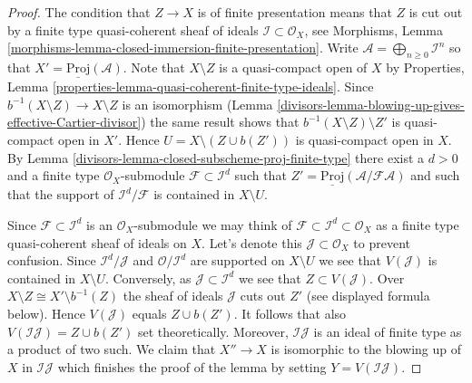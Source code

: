 \begin{proof}

The condition that $Z \to X$ is of finite presentation means that
$Z$ is cut out by a finite type quasi-coherent sheaf of ideals
$\mathcal{I} \subset \mathcal{O}_X$, see
Morphisms, Lemma \ref{morphisms-lemma-closed-immersion-finite-presentation}.
Write $\mathcal{A} = \bigoplus_{n \geq 0} \mathcal{I}^n$ so that
$X' = \underline{\text{Proj}}(\mathcal{A})$.
Note that $X \setminus Z$ is a quasi-compact open of $X$ by
Properties, Lemma \ref{properties-lemma-quasi-coherent-finite-type-ideals}.
Since $b^{-1}(X \setminus Z) \to X \setminus Z$ is an isomorphism
(Lemma \ref{divisors-lemma-blowing-up-gives-effective-Cartier-divisor}) the same
result shows that
$b^{-1}(X \setminus Z) \setminus Z'$ is quasi-compact open in $X'$.
Hence $U = X \setminus (Z \cup b(Z'))$ is quasi-compact open in $X$.
By Lemma \ref{divisors-lemma-closed-subscheme-proj-finite-type}
there exist a $d > 0$ and a finite type
$\mathcal{O}_X$-submodule $\mathcal{F} \subset \mathcal{I}^d$ such
that $Z' = \underline{\text{Proj}}(\mathcal{A}/\mathcal{F}\mathcal{A})$
and such that the support of $\mathcal{I}^d/\mathcal{F}$ is contained
in $X \setminus U$.

\medskip\noindent
Since $\mathcal{F} \subset \mathcal{I}^d$ is an $\mathcal{O}_X$-submodule
we may think of $\mathcal{F} \subset \mathcal{I}^d \subset \mathcal{O}_X$
as a finite type quasi-coherent sheaf of ideals on $X$. Let's denote this
$\mathcal{J} \subset \mathcal{O}_X$ to prevent confusion. Since
$\mathcal{I}^d / \mathcal{J}$ and $\mathcal{O}/\mathcal{I}^d$
are supported on $X \setminus U$ we see that $V(\mathcal{J})$ is contained
in $X \setminus U$. Conversely, as $\mathcal{J} \subset \mathcal{I}^d$
we see that $Z \subset V(\mathcal{J})$. Over
$X \setminus Z \cong X' \setminus b^{-1}(Z)$ the sheaf of ideals
$\mathcal{J}$ cuts out $Z'$ (see displayed formula below). Hence
$V(\mathcal{J})$ equals $Z \cup b(Z')$. It follows that also
$V(\mathcal{I}\mathcal{J}) = Z \cup b(Z')$ set theoretically. Moreover,
$\mathcal{I}\mathcal{J}$ is an ideal of finite type as a product of two such.
We claim that $X'' \to X$ is isomorphic to the blowing up of $X$ in
$\mathcal{I}\mathcal{J}$ which finishes the proof of the lemma by setting
$Y = V(\mathcal{I}\mathcal{J})$.


\end{proof}
